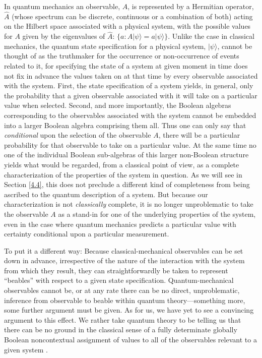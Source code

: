 In quantum mechanics an observable, $A$, is represented by a Hermitian operator, $\hat{A}$ (whose spectrum can be discrete, continuous or a combination of both) acting on the Hilbert space associated with a physical system, with the possible values for $A$ given by the eigenvalues of $\hat{A}$: $\{a: \hat{A}| \psi \rangle = a| \psi \rangle\}$. Unlike the case in classical mechanics, the quantum state specification for a physical system, $| \psi \rangle$, cannot be thought of as the truthmaker for the occurrence or non-occurrence of events related to it, for specifying the state of a system at given moment in time does not fix in advance the values taken on at that time by every observable associated with the system. First, the state specification of a system yields, in general, only the probability that a given observable associated with it will take on a particular value when selected. Second, and more importantly, the Boolean algebras corresponding to the observables associated with the system cannot be embedded into a larger Boolean algebra comprising them all. Thus one can only say that \emph{conditional} upon the selection of the observable $A$, there will be a particular probability for that observable to take on a particular value. At the same time no one of the individual Boolean sub-algebras of this larger non-Boolean structure yields what would be regarded, from a classical point of view, as a complete characterization of the properties of the system in question. As we will see in Section \ref{4.4}, this does not preclude a different kind of completeness from being ascribed to the quantum description of a system. But because our characterization is not \emph{classically} complete, it is no longer unproblematic to take the observable $A$ as a stand-in for one of the underlying properties of the system, even in the case where quantum mechanics predicts a particular value with certainty conditional upon a particular measurement.

To put it a different way: Because classical-mechanical observables can be set down in advance, irrespective of the nature of the interaction with the system from which they result, they can straightforwardly be taken to represent ``beables'' \citep[see][sec.\ 2]{Bell 1984} with respect to a given state specification. Quantum-mechanical observables cannot be, or at any rate there can be no direct, unproblematic, inference from observable to beable within quantum theory---something more, some further argument must be given. As for us, we have yet to see a convincing argument to this effect. We rather take quantum theory to be telling us that there can be no ground in the classical sense of a fully determinate globally Boolean noncontextual assignment of values to all of the observables relevant to a given system \citep[cf.][Section 9]{Pitowsky 1994}.

